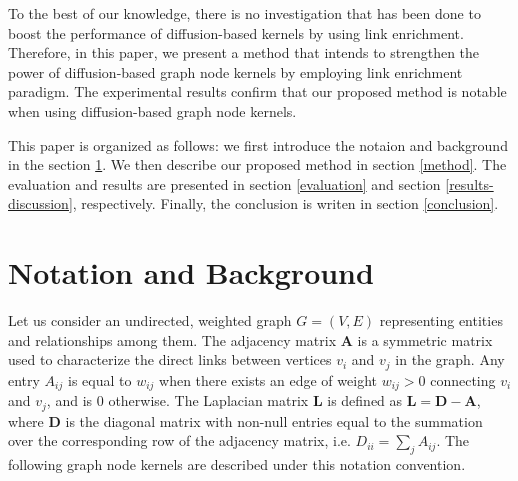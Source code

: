 \documentclass{article}
\begin{document}
To the best of our knowledge, there is no investigation that has been done to boost the performance of diffusion-based kernels by using link enrichment. Therefore, in this paper, we present a method that intends to strengthen the power of diffusion-based graph node kernels by employing link enrichment paradigm. The experimental results confirm that our proposed method is notable when using diffusion-based graph node kernels.

This paper is organized as follows: we first introduce the notaion and background in the section \ref{background}. We then describe our proposed method in section \ref{method}. The evaluation and results are presented in section \ref{evaluation} and section \ref{results-discussion}, respectively. Finally, the conclusion is writen in section \ref{conclusion}.

\section{Notation and Background}
\label{background}
Let us consider an undirected, weighted graph $G = (V, E)$ representing entities and relationships among them. The adjacency matrix $\textbf{A}$ is a symmetric matrix used to characterize the direct links between vertices $v_{i}$ and $v_{j}$ in the graph. Any entry $A_{ij}$ is equal to $w_{ij}$ when there exists an edge of weight $w_{ij}>0$ connecting $v_{i}$ and $v_{j}$, and is 0 otherwise. The Laplacian matrix $\textbf{L}$ is defined as $\textbf{L} = \textbf{D}-\textbf{A}$, where $\textbf{D}$ is the diagonal matrix with non-null entries equal to the summation over the corresponding row of the adjacency matrix, i.e. $D_{ii}=\sum_j A_{ij}$. The following graph node kernels are described under this notation convention. 
\end{document}
